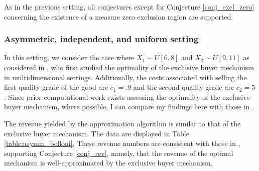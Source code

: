 \documentclass{article}
\newcounter{fig}
\begin{document}



  

As in the previous setting, all conjectures except for Conjecture \ref{conj_excl_zero} concerning the existence of a measure zero exclusion region are supported.








\subsubsection{Asymmetric, independent, and uniform setting}

In this setting, we consider the case where $X_1 \sim U[6,8]$ and $X_2 \sim U[9,11]$ as considered in \autocite{belloni2010multidimensional}, who first studied the optimality of the exclusive buyer mechanism in multidimensional settings. Additionally, the costs associated with selling the first quality grade of the good are $c_1 = .9$ and the second quality grade are $c_2 = 5$. Since prior computational work exists assessing the optimality of the exclusive buyer mechanism, where possible, I can compare my findings here with those in \autocite{belloni2010multidimensional}. 

The revenue yielded by the approximation algorithm is similar to that of the exclusive buyer mechanism. The data are displayed in Table \ref{table:asymm_belloni}. These revenue numbers are consistent with those in \autocite[Table 3]{belloni2010multidimensional}, supporting Conjecture \ref{conj_rev}, namely, that the revenue of the optimal mechanism is well-approximated by the exclusive buyer mechanism.
\end{document}
